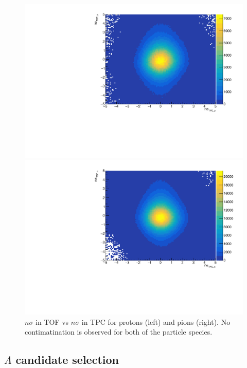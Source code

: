 \begin{figure}[h]
	\centering
	\begin{minipage}{0.48\textwidth}
		\includegraphics[width=\textwidth]{figures/analysis/nsigma_tof_v_tpc_proton.pdf}
	\end{minipage}
	\begin{minipage}{0.48\textwidth}
		\includegraphics[width=\textwidth]{figures/analysis/nsigma_tof_v_tpc_pion.pdf}
	\end{minipage}
    \caption{$n\sigma$ in TOF vs $n\sigma$ in TPC for protons (left) and pions (right). No contimatination is observed for both of the particle species.}
	\label{fig:nsigma_tof_v_tpc}
\end{figure}

\clearpage

\subsection{$\Lambda$ candidate selection}

